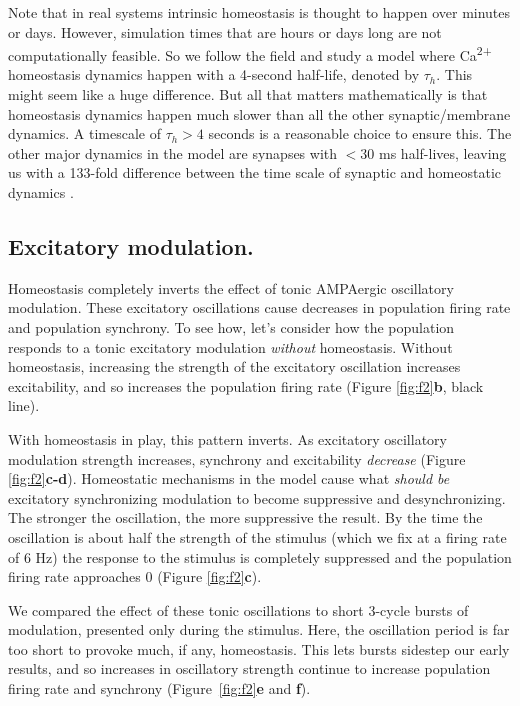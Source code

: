 \documentclass{article}
\begin{document}
Note that in real systems intrinsic homeostasis is thought to happen over minutes or days. However, simulation times that are hours or days long are not computationally feasible. So we follow the field and study a model where Ca\textsuperscript{2+} homeostasis dynamics happen with a 4-second half-life, denoted by $\tau_h$. This might seem like a huge difference. But all that matters mathematically is that homeostasis dynamics happen much slower than all the other synaptic/membrane dynamics. A timescale of $\tau_h > 4$ seconds is a reasonable choice to ensure this. The other major dynamics in the model are synapses with $< 30$ ms half-lives, leaving us with a 133-fold difference between the time scale of synaptic and homeostatic dynamics \cite{Golowasch1999,Marder2014,Marder2015,Gutierrez2013,Marder2014,OLeary2014,LeMasson1993,Abbott1993}.

\subsection*{Excitatory modulation.}
Homeostasis completely inverts the effect of tonic AMPAergic oscillatory modulation. These excitatory oscillations cause decreases in population firing rate and population synchrony. To see how, let's consider how the population responds to a tonic excitatory modulation \textit{without} homeostasis. Without homeostasis, increasing the strength of the excitatory oscillation increases excitability, and so increases the population firing rate (Figure \ref{fig:f2}\textbf{b}, black line). 

With homeostasis in play, this pattern inverts. As excitatory oscillatory modulation strength increases, synchrony and excitability \emph{decrease} (Figure \ref{fig:f2}\textbf{c-d}). Homeostatic mechanisms in the model cause what \emph{should be} excitatory synchronizing modulation to become suppressive and desynchronizing. The stronger the oscillation, the more suppressive the result. By the time the oscillation is about half the strength of the stimulus (which we fix at a firing rate of 6 Hz) the response to the stimulus is completely suppressed and the population firing rate approaches 0 (Figure \ref{fig:f2}\textbf{c}).

We compared the effect of these tonic oscillations to short 3-cycle bursts of modulation, presented only during the stimulus. Here, the oscillation period is far too short to provoke much, if any, homeostasis. This lets bursts sidestep our early results, and so increases in oscillatory strength continue to increase population firing rate and synchrony (Figure~\ref{fig:f2}\textbf{e} and \textbf{f}).
\end{document}
